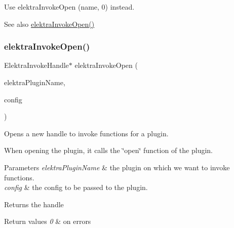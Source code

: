 Use {\ttfamily elektra\+Invoke\+Open (name, 0)} instead.

\begin{DoxySeeAlso}{See also}
\hyperlink{group__invoke_ga3fd9791ecf43c0dde08a2fc1f02db6bc}{elektra\+Invoke\+Open()} 
\end{DoxySeeAlso}
\mbox{\label{group__invoke_ga3fd9791ecf43c0dde08a2fc1f02db6bc}} 
\subsubsection{\texorpdfstring{elektra\+Invoke\+Open()}{elektraInvokeOpen()}}
{\footnotesize\ttfamily Elektra\+Invoke\+Handle$\ast$ elektra\+Invoke\+Open (\begin{DoxyParamCaption}\item[{const char $\ast$}]{elektra\+Plugin\+Name,  }\item[{Key\+Set $\ast$}]{config }\end{DoxyParamCaption})}



Opens a new handle to invoke functions for a plugin. 

When opening the plugin, it calls the \char`\"{}open\char`\"{} function of the plugin.


\begin{DoxyParams}{Parameters}
{\em elektra\+Plugin\+Name} & the plugin on which we want to invoke functions. \\
\hline
{\em config} & the config to be passed to the plugin.\\
\hline
\end{DoxyParams}
\begin{DoxyReturn}{Returns}
the handle 
\end{DoxyReturn}

\begin{DoxyRetVals}{Return values}
{\em 0} & on errors \\
\hline
\end{DoxyRetVals}
